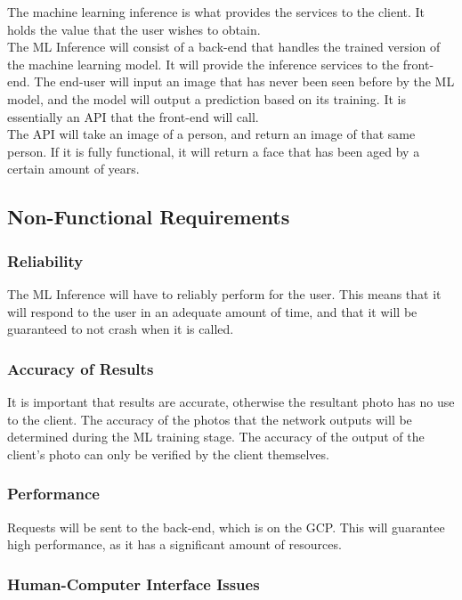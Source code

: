 \documentclass[12pt]{article}
\begin{document}
The machine learning inference is what provides the services to the client. It holds the value that the user wishes to obtain.\\

The ML Inference will consist of a back-end that handles the trained version of the machine learning model. It will provide the inference services to the front-end. The end-user will input an image that has never been seen before by the ML model, and the model will output a prediction based on its training. It is essentially an API that the front-end will call.\\

The API will take an image of a person, and return an image of that same person. If it is fully functional, it will return a face that has been aged by a certain amount of years.

\subsection{Non-Functional Requirements}

\subsubsection {Reliability}

The ML Inference will have to reliably perform for the user. This means that it will respond to the user in an adequate amount of time, and that it will be guaranteed to not crash when it is called.

\subsubsection {Accuracy of Results}

It is important that results are accurate, otherwise the resultant photo has no use to the client. The accuracy of the photos that the network outputs will be determined during the ML training stage. The accuracy of the output of the client's photo can only be verified by the client themselves.

\subsubsection {Performance}

Requests will be sent to the back-end, which is on the GCP. This will guarantee high performance, as it has a significant amount of resources.

\subsubsection {Human-Computer Interface Issues}
\end{document}
